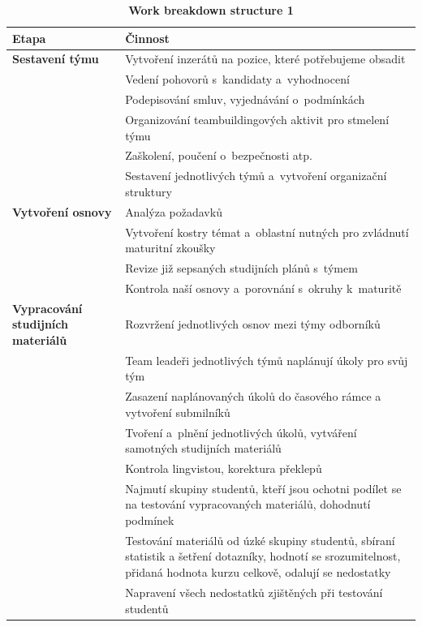 \documentclass[12pt, a4paper]{report}
\begin{document}
\begin{table}[htbp]
\caption{\label{tab:wbs1}
\textbf{Work breakdown structure 1}}
\centering
\scriptsize
\begin{tabularx}{\textwidth}{|X|X|}
\hline
Etapa & Činnost\\
\hline
\textbf{Sestavení týmu} & Vytvoření inzerátů na pozice, které potřebujeme obsadit\\
\hline
 & Vedení pohovorů s kandidaty a vyhodnocení\\
\hline
 & Podepisování smluv, vyjednávání o podmínkách\\
\hline
 & Organizování teambuildingových aktivit pro stmelení týmu\\
\hline
 & Zaškolení, poučení o bezpečnosti atp.\\
\hline
 & Sestavení jednotlivých týmů a vytvoření organizační struktury\\
\hline
\textbf{Vytvoření osnovy} & Analýza požadavků\\
\hline
 & Vytvoření kostry témat a oblastní nutných pro zvládnutí maturitní zkoušky\\
\hline
 & Revize již sepsaných studijních plánů s týmem\\
\hline
 & Kontrola naší osnovy a porovnání s okruhy k maturitě\\
\hline
\textbf{Vypracování studijních materiálů} & Rozvržení jednotlivých osnov mezi týmy odborníků\\
\hline
 & Team leadeři jednotlivých týmů naplánují úkoly pro svůj tým\\
\hline
 & Zasazení naplánovaných úkolů do časového rámce a vytvoření submilníků\\
\hline
 & Tvoření a plnění jednotlivých úkolů, vytváření samotných studijních materiálů\\
\hline
 & Kontrola lingvistou, korektura překlepů\\
\hline
 & Najmutí skupiny studentů, kteří jsou ochotni podílet se na testování vypracovaných materiálů, dohodnutí podmínek\\
\hline
 & Testování materiálů od úzké skupiny studentů, sbíraní statistik a šetření dotazníky, hodnotí se srozumitelnost, přidaná hodnota kurzu celkově, odalují se nedostatky\\
\hline
 & Napravení všech nedostatků zjištěných při testování studentů\\
\hline
\end{tabularx}
\end{table}
\end{document}
